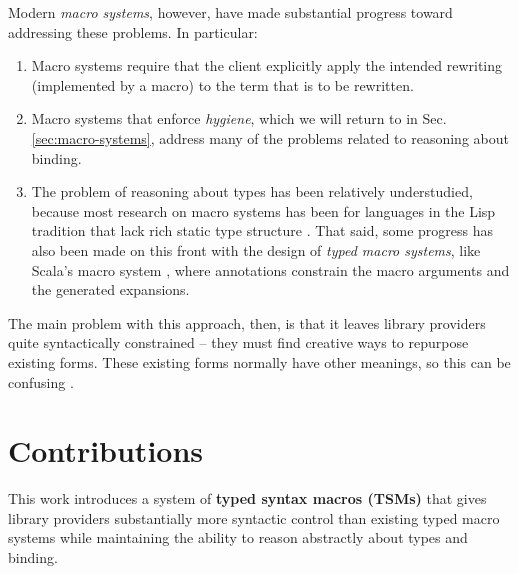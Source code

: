 Modern \emph{macro systems}, however, have made substantial progress toward addressing these problems. In particular:
\begin{enumerate}
\item Macro systems require that the client explicitly apply the intended rewriting (implemented by a macro) to the term that is to be rewritten.
\item Macro systems that enforce \emph{hygiene}, which we will return to in Sec. \ref{sec:macro-systems}, address many of the problems related to reasoning about binding. 
\item The problem of reasoning about types has been relatively understudied, because most research on macro systems has been for languages in the Lisp tradition that lack rich static type structure \cite{mccarthy1978history}. That said, some progress has also been made on this front with the design of \emph{typed macro systems}, like Scala's macro system \cite{ScalaMacros2013}, where annotations constrain the macro arguments and the generated expansions.
\end{enumerate}

The main problem with this approach, then, is that it leaves library providers quite syntactically constrained -- they must find creative ways to repurpose existing forms. These existing forms normally have other meanings, so this can be confusing \cite{pane1996usability}.

\vspace{-10px}
\section{Contributions}\label{sec:contributions}

This work introduces a system of \textbf{typed syntax macros (TSMs)} that gives library providers substantially more syntactic control than existing typed macro systems while maintaining the ability to reason abstractly about types and binding.%

